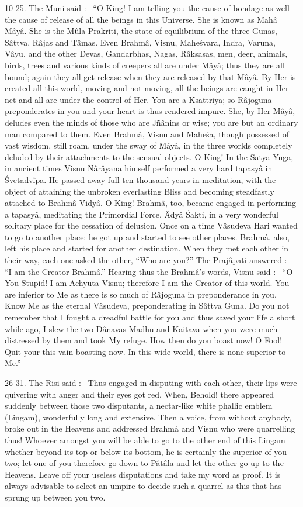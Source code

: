 10-25. The Muni said :-- ``O King! I am telling you the cause of bondage as well the cause of release of all the beings in this Universe. She is known as Mah\^a M\^ay\^a. She is the M\^ula Prakriti, the state of equilibrium of the three Gunas, S\^attva, R\^ajas and T\^amas. Even Brahm\^a, Visnu, Mahe\'svara, Indra, Varuna, V\^ayu, and the other Devas, Gandarbhas, Nagas, R\^aksasas, men, deer, animals, birds, trees and various kinds of creepers all are under M\^ay\^a; thus they are all bound; again they all get release when they are released by that M\^ay\^a. By Her is created all this world, moving and not moving, all the beings are caught in Her net and all are under the control of Her. You are a Ksattriya; so R\^ajoguna preponderates in you and your heart is thus rendered impure. She, by Her M\^ay\^a, deludes even the minds of those who are Jñ\^anins or wise; you are but an ordinary man compared to them. Even Brahm\^a, Visnu and Mahe\'sa, though possessed of vast wisdom, still roam, under the sway of M\^ay\^a, in the three worlds completely deluded by their attachments to the sensual objects. O King! In the Satya Yuga, in ancient times Visnu N\^ar\^ayana himself performed a very hard tapasy\^a in \'Svetadv\^ipa. He passed away full ten thousand years in meditation, with the object of attaining the unbroken everlasting Bliss and becoming steadfastly attached to Brahm\^a Vidy\^a. O King! Brahm\^a, too, became engaged in performing a tapasy\^a, meditating the Primordial Force, \^Ady\^a \'Sakti, in a very wonderful solitary place for the cessation of delusion. Once on a time V\^asudeva Hari wanted to go to another place; he got up and started to see other places. Brahm\^a, also, left his place and started for another destination. When they met each other in their way, each one asked the other, ``Who are you?'' The Praj\^apati answered :-- ``I am the Creator Brahm\^a.'' Hearing thus the Brahm\^a's words, Visnu said :-- ``O You Stupid! I am Achyuta Visnu; therefore I am the Creator of this world. You are inferior to Me as there is so much of R\^ajoguna in preponderance in you. Know Me as the eternal V\^asudeva, preponderating in S\^attva Guna. Do you not remember that I fought a dreadful battle for you and thus saved your life a short while ago, I slew the two D\^anavas Madhu and Kaitava when you were much distressed by them and took My refuge. How then do you boast now! O Fool! Quit your this vain boasting now. In this wide world, there is none superior to Me.''

26-31. The Risi said :-- Thus engaged in disputing with each other, their lips were quivering with anger and their eyes got red. When, Behold! there appeared suddenly between those two disputants, a nectar-like white phallic emblem (Lingam), wonderfully long and extensive. Then a voice, from without anybody, broke out in the Heavens and addressed Brahm\^a and Visnu who were quarrelling thus! Whoever amongst you will be able to go to the other end of this Lingam whether beyond its top or below its bottom, he is certainly the superior of you two; let one of you therefore go down to P\^at\^ala and let the other go up to the Heavens. Leave off your useless disputations and take my word as proof. It is always advisable to select an umpire to decide such a quarrel as this that has sprung up between you two.

